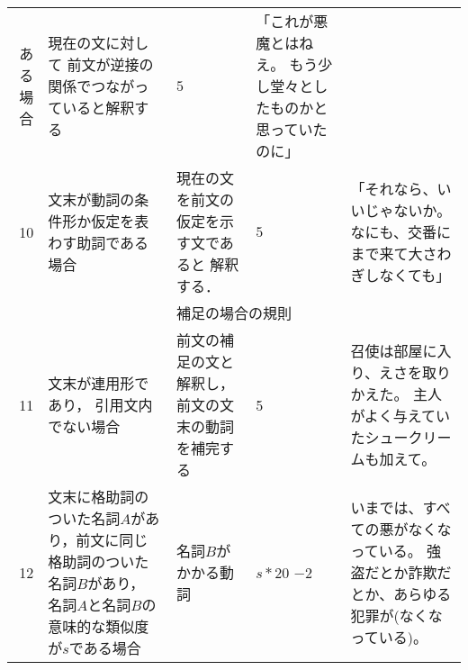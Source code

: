 \begin{table}[t]
\begin{center}
\begin{tabular}[c]{|@{ }r@{ }|p{4cm}|p{3cm}|@{ }p{0.6cm}@{ }|p{3.9cm}|}
  ある場合&
  現在の文に対して
  前文が逆接の関係でつながっていると解釈する&
  $5$&
  「これが悪魔とはねえ。
  もう少し堂々としたものかと思っていたのに」
  \\
  10&
  文末が動詞の条件形か仮定を表わす助詞である場合&
  現在の文を前文の仮定を示す文であると
  解釈する．&
  $5$&
  「それなら、いいじゃないか。
  なにも、交番にまで来て大さわぎしなくても」\\\hline
\multicolumn{5}{|c|}{補足の場合の規則}\\\hline
  11&
  文末が連用形であり，
  引用文内でない場合 &
  前文の補足の文と解釈し，前文の文末の動詞を補完する&
  5&
  召使は部屋に入り、えさを取りかえた。 
  主人がよく与えていたシュークリームも加えて。\\
  12&
  文末に格助詞のついた名詞$A$があり，前文に同じ格助詞のついた名詞$B$があり，
  名詞$A$と名詞$B$の意味的な類似度が$s$である場合&
  名詞$B$がかかる動詞  &
  $s*20$ $-2$&
  いまでは、すべての悪がなくなっている。
  強盗だとか詐欺だとか、あらゆる犯罪が(なくなっている)。
  \\\hline
\end{tabular}
\end{center}
\end{table}

\clearpage

